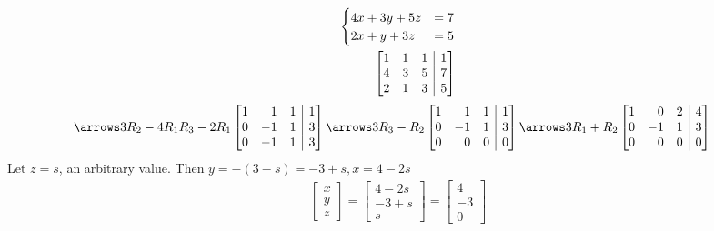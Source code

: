 \begin{itemize}
\begin{align*}
\begin{cases}
        4x + 3y + 5z &= 7 \\
        2x + y + 3z &= 5
      \end{cases}
      \\
      \left[\begin{array}{@{}rrr|r@{}}
        1 & 1 & 1 & 1 \\
        4 & 3 & 5 & 7 \\
        2 & 1 & 3 & 5 \\
      \end{array}\right]
    \end{align*}
    \begin{align*}
      &
      \arrows3{}{R_2 - 4R_1}{R_3 - 2R_1}
      \left[\begin{array}{@{}rrr|r@{}}
        1 & 1 & 1 & 1 \\
        0 & -1 & 1 & 3 \\
        0 & -1 & 1 & 3 \\
      \end{array}\right]
      \arrows3{}{}{R_3 - R_2}
      \left[\begin{array}{@{}rrr|r@{}}
        1 & 1 & 1 & 1 \\
        0 & -1 & 1 & 3 \\
        0 & 0 & 0 & 0 \\
      \end{array}\right]
      \arrows3{R_1 + R_2}{}{}
      \left[\begin{array}{@{}rrr|r@{}}
        1 & 0 & 2 & 4 \\
        0 & -1 & 1 & 3 \\
        0 & 0 & 0 & 0 \\
      \end{array}\right]
    \end{align*}
    Let $z = s$, an arbitrary value.
    Then $y = -(3 - s) = -3 + s, x = 4 - 2s$
    \begin{align*}
      \begin{bmatrix}
        x \\ y \\ z
      \end{bmatrix}
      =
      \begin{bmatrix}
        4 - 2s\\ -3 + s\\ s
      \end{bmatrix}
      =
      \begin{bmatrix}
        4\\ -3 \\ 0

\end{bmatrix}
\end{align*}
\end{itemize}
